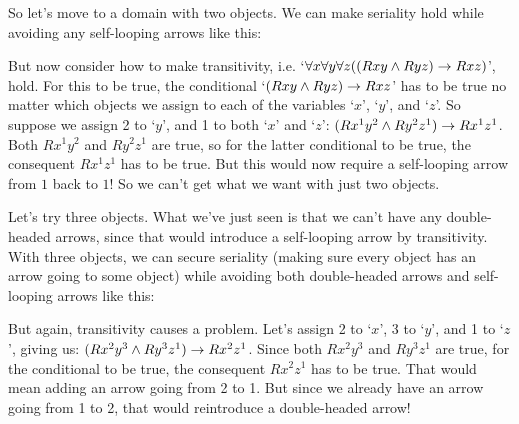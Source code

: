 So let's move to a domain with two objects.  We can make seriality hold while avoiding any self-looping arrows like this:
\begin{center}
\end{center}
But now consider how to make transitivity, i.e. `$\forall x \forall y \forall z((Rxy \wedge Ryz) \rightarrow Rxz)$', hold.  For this to be true, the conditional `$(Rxy \wedge Ryz) \rightarrow Rxz$' has to be true no matter which objects we assign to each of the variables `$x$', `$y$', and `$z$'. So suppose we assign  2 to `$y$', and 1 to both `$x$' and `$z$': $(Rx^1y^2 \wedge Ry^2z^1) \rightarrow Rx^1z^1$.  Both $Rx^1y^2$ and $Ry^2z^1$ are true, so for the latter conditional to be true, the consequent $Rx^1z^1$ has to be true.  But this would now require a self-looping arrow from $1$ back to $1$!  So we can't get what we want with just two objects.

Let's try three objects.  What we've just seen is that we can't have any double-headed arrows, since that would introduce a self-looping arrow by transitivity.  With three objects, we can secure seriality (making sure every object has an arrow going to some object) while avoiding both double-headed arrows and self-looping arrows like this:
\begin{center}
\end{center}
But again, transitivity causes a problem.  Let's assign 2 to `$x$', 3 to `$y$', and 1 to `$z$', giving us: $(Rx^2y^3 \wedge Ry^3z^1) \rightarrow Rx^2z^1$.  Since both $Rx^2y^3$ and $Ry^3z^1$ are true, for the conditional to be true, the consequent $Rx^2z^1$ has to be true.   That would mean adding an arrow going from 2 to 1.  But since we already have an arrow going from 1 to 2,  that would reintroduce a double-headed arrow!

